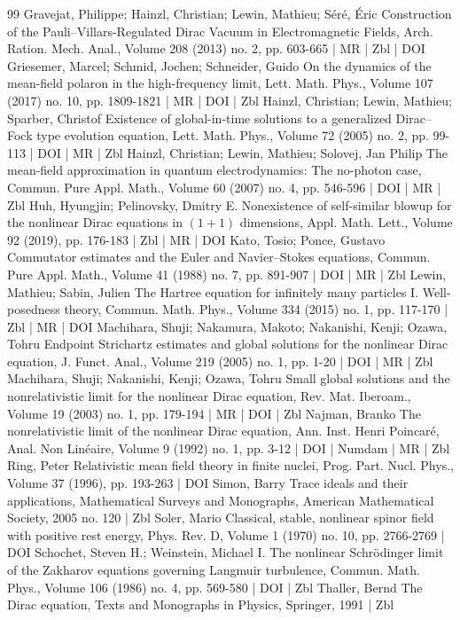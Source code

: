 \begin{thebibliography}{99}
Gravejat, Philippe; Hainzl, Christian; Lewin, Mathieu; Séré, Éric Construction of the Pauli–Villars-Regulated Dirac Vacuum in Electromagnetic Fields, Arch. Ration. Mech. Anal., Volume 208 (2013) no. 2, pp. 603-665 | MR | Zbl | DOI
Griesemer, Marcel; Schmid, Jochen; Schneider, Guido On the dynamics of the mean-field polaron in the high-frequency limit, Lett. Math. Phys., Volume 107 (2017) no. 10, pp. 1809-1821 | MR | DOI | Zbl
Hainzl, Christian; Lewin, Mathieu; Sparber, Christof Existence of global-in-time solutions to a generalized Dirac–Fock type evolution equation, Lett. Math. Phys., Volume 72 (2005) no. 2, pp. 99-113 | DOI | MR | Zbl
Hainzl, Christian; Lewin, Mathieu; Solovej, Jan Philip The mean-field approximation in quantum electrodynamics: The no-photon case, Commun. Pure Appl. Math., Volume 60 (2007) no. 4, pp. 546-596 | DOI | MR | Zbl
Huh, Hyungjin; Pelinovsky, Dmitry E. Nonexistence of self-similar blowup for the nonlinear Dirac equations in $(1+1)$ dimensions, Appl. Math. Lett., Volume 92 (2019), pp. 176-183 | Zbl | MR | DOI
Kato, Tosio; Ponce, Gustavo Commutator estimates and the Euler and Navier–Stokes equations, Commun. Pure Appl. Math., Volume 41 (1988) no. 7, pp. 891-907 | DOI | MR | Zbl
Lewin, Mathieu; Sabin, Julien The Hartree equation for infinitely many particles I. Well-posedness theory, Commun. Math. Phys., Volume 334 (2015) no. 1, pp. 117-170 | Zbl | MR | DOI
Machihara, Shuji; Nakamura, Makoto; Nakanishi, Kenji; Ozawa, Tohru Endpoint Strichartz estimates and global solutions for the nonlinear Dirac equation, J. Funct. Anal., Volume 219 (2005) no. 1, pp. 1-20 | DOI | MR | Zbl
Machihara, Shuji; Nakanishi, Kenji; Ozawa, Tohru Small global solutions and the nonrelativistic limit for the nonlinear Dirac equation, Rev. Mat. Iberoam., Volume 19 (2003) no. 1, pp. 179-194 | MR | DOI | Zbl
Najman, Branko The nonrelativistic limit of the nonlinear Dirac equation, Ann. Inst. Henri Poincaré, Anal. Non Linéaire, Volume 9 (1992) no. 1, pp. 3-12 | DOI | Numdam | MR | Zbl
Ring, Peter Relativistic mean field theory in finite nuclei, Prog. Part. Nucl. Phys., Volume 37 (1996), pp. 193-263 | DOI
Simon, Barry Trace ideals and their applications, Mathematical Surveys and Monographs, American Mathematical Society, 2005 no. 120 | Zbl
Soler, Mario Classical, stable, nonlinear spinor field with positive rest energy, Phys. Rev. D, Volume 1 (1970) no. 10, pp. 2766-2769 | DOI
Schochet, Steven H.; Weinstein, Michael I. The nonlinear Schrödinger limit of the Zakharov equations governing Langmuir turbulence, Commun. Math. Phys., Volume 106 (1986) no. 4, pp. 569-580 | DOI | Zbl
Thaller, Bernd The Dirac equation, Texts and Monographs in Physics, Springer, 1991 | Zbl
\end{thebibliography}
